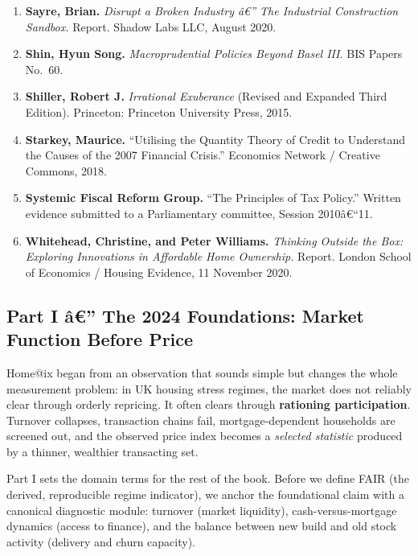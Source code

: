 \begin{enumerate}
\item
  \protect{}\label{ref-sayre2020}{\textbf{Sayre, Brian.}
  \emph{Disrupt a Broken Industry â€'' The Industrial Construction
  Sandbox.} Report. Shadow Labs LLC, August 2020.}
\item
  \protect{}\label{ref-shin-bis}{\textbf{Shin, Hyun Song.}
  \emph{Macroprudential Policies Beyond Basel III.} BIS Papers No.~60.}
\item
  \protect{}\label{ref-shiller2015}{\textbf{Shiller, Robert
  J.} \emph{Irrational Exuberance} (Revised and Expanded Third Edition).
  Princeton: Princeton University Press, 2015.}
\item
  \protect{}\label{ref-starkey2018}{\textbf{Starkey,
  Maurice.} ``Utilising the Quantity Theory of Credit to Understand the
  Causes of the 2007 Financial Crisis.'' Economics Network / Creative
  Commons, 2018.}
\item
  \protect{}\label{ref-sfrg2010}{\textbf{Systemic Fiscal
  Reform Group.} ``The Principles of Tax Policy.'' Written evidence
  submitted to a Parliamentary committee, Session 2010â€``11.}
\item
  \protect{}\label{ref-whitehead2020}{\textbf{Whitehead,
  Christine, and Peter Williams.} \emph{Thinking Outside the Box:
  Exploring Innovations in Affordable Home Ownership.} Report. London
  School of Economics / Housing Evidence, 11 November 2020.}
\end{enumerate}

\protect{}\label{part1}
\subsection{Part I â€'' The 2024 Foundations: Market Function Before
Price}\label{part-i-uxe2-the-2024-foundations-market-function-before-price}

Home@ix began from an observation that sounds simple but changes the
whole measurement problem: in UK housing stress regimes, the market does
not reliably clear through orderly repricing. It often clears through
\textbf{rationing participation}. Turnover collapses, transaction chains
fail, mortgage-dependent households are screened out, and the observed
price index becomes a \emph{selected statistic} produced by a thinner,
wealthier transacting set.

Part I sets the domain terms for the rest of the book. Before we define
FAIR (the derived, reproducible regime indicator), we anchor the
foundational claim with a canonical diagnostic module: turnover (market
liquidity), cash-versus-mortgage dynamics (access to finance), and the
balance between new build and old stock activity (delivery and churn
capacity).

